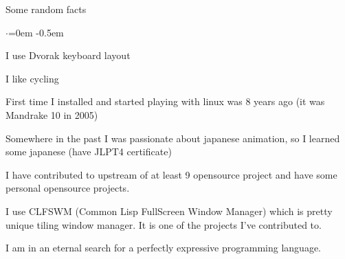 \documentclass{resume} %
\begin{document}

\begin{rSection}{Some random facts}
  \smallskip
  \begin{list}{$\cdot$}{\leftmargin=0em} %
    \itemsep -0.5em \vspace{-0.5em} %
  \item I use Dvorak keyboard layout
  \item I like cycling
  \item First time I installed and started playing with linux was 8 years ago (it was
    Mandrake 10 in 2005)
  \item Somewhere in the past I was passionate about japanese animation, so I learned
    some japanese (have JLPT4 certificate)
  \item I have contributed to upstream of at least 9 opensource project 
      and have some personal opensource projects.
  \item I use CLFSWM (Common Lisp FullScreen Window Manager) which is pretty unique tiling
      window manager. It is one of the projects I've contributed to.
  \item I am in an eternal search for a perfectly expressive programming language.
  \end{list}
\end{rSection}

\end{document}
